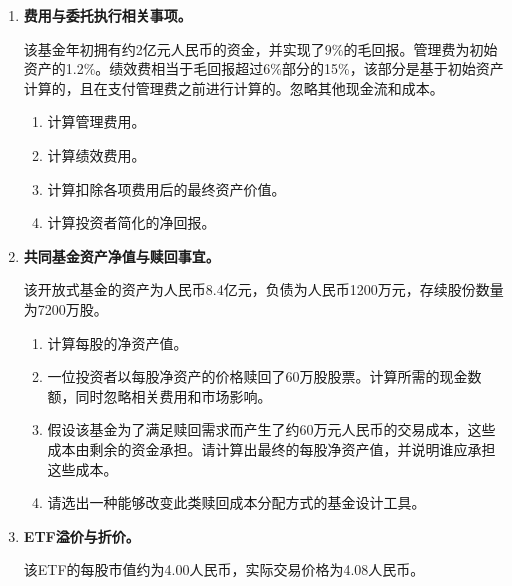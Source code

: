 

\begin{enumerate}

\item \textbf{费用与委托执行相关事项。}

该基金年初拥有约2亿元人民币的资金，并实现了9\%的毛回报。管理费为初始资产的1.2\%。绩效费相当于毛回报超过6\%部分的15\%，该部分是基于初始资产计算的，且在支付管理费之前进行计算的。忽略其他现金流和成本。

\begin{enumerate}

\item 计算管理费用。

\item 计算绩效费用。

\item 计算扣除各项费用后的最终资产价值。

\item 计算投资者简化的净回报。

\end{enumerate}

\item \textbf{共同基金资产净值与赎回事宜。}

该开放式基金的资产为人民币8.4亿元，负债为人民币1200万元，存续股份数量为7200万股。

\begin{enumerate}

\item 计算每股的净资产值。

\item 一位投资者以每股净资产的价格赎回了60万股股票。计算所需的现金数额，同时忽略相关费用和市场影响。

\item 假设该基金为了满足赎回需求而产生了约60万元人民币的交易成本，这些成本由剩余的资金承担。请计算出最终的每股净资产值，并说明谁应承担这些成本。

\item 请选出一种能够改变此类赎回成本分配方式的基金设计工具。

\end{enumerate}

\item \textbf{ETF溢价与折价。}

该ETF的每股市值约为4.00人民币，实际交易价格为4.08人民币。


\end{enumerate}
